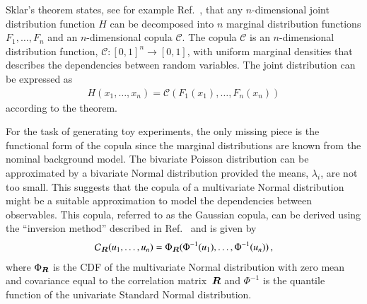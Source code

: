 Sklar's theorem states, see for example Ref.~\cite{nelsen}, that any
$n$-dimensional joint distribution function $H$ can be decomposed into $n$
marginal distribution functions $F_1, \dots, F_n$ and an $n$-dimensional copula
$\mathcal{C}$. The copula $\mathcal{C}$ is an $n$-dimensional distribution
function, $\mathcal{C}: [0, 1]^n \rightarrow [0, 1]$, with uniform marginal
densities that describes the dependencies between random variables. The joint
distribution can be expressed as
\begin{align*}
  H(x_1, \dots, x_n) = \mathcal{C}(F_1(x_1), \dots, F_n(x_n))
\end{align*}
according to the theorem.

For the task of generating toy experiments, the only missing piece is the
functional form of the copula since the marginal distributions are known from
the nominal background model. The bivariate Poisson distribution can be
approximated by a bivariate Normal distribution provided the means, $\lambda_i$,
are not too small. This suggests that the copula of a multivariate Normal
distribution might be a suitable approximation to model the dependencies between
observables. This copula, referred to as the Gaussian copula, can be derived
using the ``inversion method'' described in Ref.~\cite{nelsen} and is given by
\begin{align}
  \mathcal{C}_{\bm{R}}(u_1, \dots, u_n) = \Phi_{\bm{R}}(\Phi^{-1}(u_1), \dots, \Phi^{-1}(u_n)) \,\text{,}
  \label{eq:gaussian_copula}
\end{align}
where $\Phi_{\bm{R}}$ is the CDF of the multivariate Normal distribution with
zero mean and covariance equal to the correlation matrix~$\bm{R}$ and
$\Phi^{-1}$ is the quantile function of the univariate Standard Normal
distribution.

